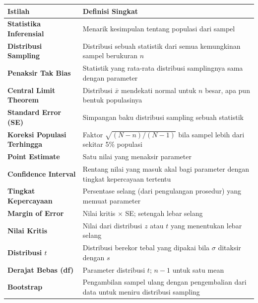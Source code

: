 \documentclass[
  indonesian,
  letterpaper,
]{book}
\newcounter{none} %
\begin{document}
{\def\LTcaptype{none} %
\begin{longtable}[]{@{}
  >{\raggedright\arraybackslash}p{}
  >{\raggedright\arraybackslash}p{}@{}}
\toprule\noalign{}
\begin{minipage}[b]{\linewidth}\raggedright
Istilah
\end{minipage} & \begin{minipage}[b]{\linewidth}\raggedright
Definisi Singkat
\end{minipage} \\
\midrule\noalign{}
\endhead
\bottomrule\noalign{}
\endlastfoot
\textbf{Statistika Inferensial} & Menarik kesimpulan tentang populasi
dari sampel \\
\textbf{Distribusi Sampling} & Distribusi sebuah statistik dari semua
kemungkinan sampel berukuran \(n\) \\
\textbf{Penaksir Tak Bias} & Statistik yang rata-rata distribusi
samplingnya sama dengan parameter \\
\textbf{Central Limit Theorem} & Distribusi \(\bar{x}\) mendekati normal
untuk \(n\) besar, apa pun bentuk populasinya \\
\textbf{Standard Error (SE)} & Simpangan baku distribusi sampling sebuah
statistik \\
\textbf{Koreksi Populasi Terhingga} & Faktor \(\sqrt{(N-n)/(N-1)}\) bila
sampel lebih dari sekitar 5\% populasi \\
\textbf{Point Estimate} & Satu nilai yang menaksir parameter \\
\textbf{Confidence Interval} & Rentang nilai yang masuk akal bagi
parameter dengan tingkat kepercayaan tertentu \\
\textbf{Tingkat Kepercayaan} & Persentase selang (dari pengulangan
prosedur) yang memuat parameter \\
\textbf{Margin of Error} & Nilai kritis × SE; setengah lebar selang \\
\textbf{Nilai Kritis} & Nilai dari distribusi \(z\) atau \(t\) yang
menentukan lebar selang \\
\textbf{Distribusi \(t\)} & Distribusi berekor tebal yang dipakai bila
\(\sigma\) ditaksir dengan \(s\) \\
\textbf{Derajat Bebas (df)} & Parameter distribusi \(t\); \(n-1\) untuk
satu mean \\
\textbf{Bootstrap} & Pengambilan sampel ulang dengan pengembalian dari
data untuk meniru distribusi sampling \\
\end{longtable}
}
\end{document}
